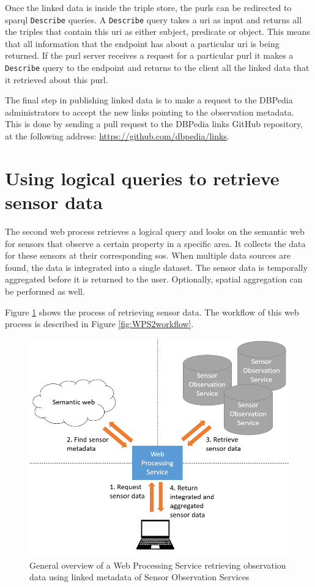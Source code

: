 Once the linked data is inside the triple store, the \acp{purl} can be redirected to \ac{sparql} \texttt{Describe} queries. A \texttt{Describe} query takes a \ac{uri} as input and returns all the triples that contain this \ac{uri} as either subject, predicate or object. This means that all information that the endpoint has about a particular \ac{uri} is being returned. If the \ac{purl} server receives a request for a particular \ac{purl} it makes a \texttt{Describe} query to the endpoint and returns to the client all the linked data that it retrieved about this \ac{purl}.  

The final step in publishing linked data is to make a request to the DBPedia administrators to accept the new links pointing to the observation metadata. This is done by sending a pull request to the DBPedia links GitHub repository, at the following address: \url{https://github.com/dbpedia/links}.


\section{Using logical queries to retrieve sensor data}
\label{par:logicalDesign}
The second web process retrieves a logical query and looks on the semantic web for sensors that observe a certain property in a specific area. It collects the data for these sensors at their corresponding \acl{sos}. When multiple data sources are found, the data is integrated into a single dataset. The sensor data is temporally aggregated before it is returned to the user. Optionally, spatial aggregation can be performed as well.

Figure \ref{fig:WPS2} shows the process of retrieving sensor data. The workflow of this web process is described in Figure \ref{fig:WPS2workflow}.

\begin{figure}
	\centering
	\includegraphics[width=0.8\linewidth]{UML/wps2diagram.PNG}
	\caption{General overview of a Web Processing Service retrieving observation data using linked metadata of Sensor Observation Services}
	\label{fig:WPS2}
\end{figure}

